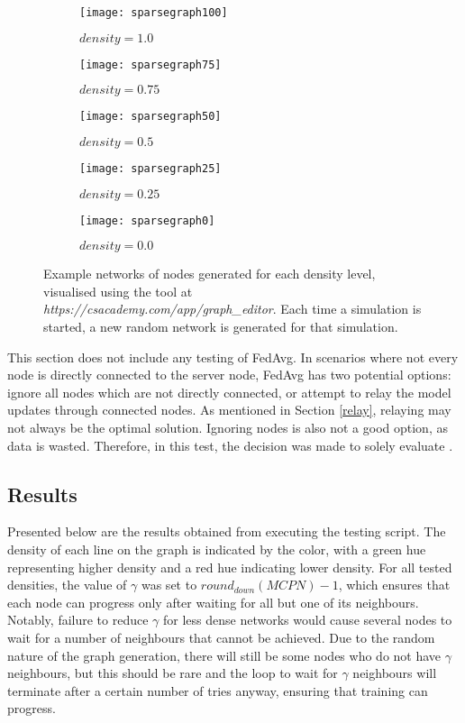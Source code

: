 \begin{figure}[H]
	\centering
	\begin{subfigure}[b]{0.3\textwidth}
		\centering
		\texttt{[image: sparsegraph100]}
		\caption{$density=1.0$}
	\end{subfigure}
	\begin{subfigure}[b]{0.3\textwidth}
		\centering
		\texttt{[image: sparsegraph75]}
		\caption{$density=0.75$}
	\end{subfigure}
	\begin{subfigure}[b]{0.3\textwidth}
		\centering
		\texttt{[image: sparsegraph50]}
		\caption{$density=0.5$}
	\end{subfigure}
	\begin{subfigure}[b]{0.3\textwidth}
		\centering
		\texttt{[image: sparsegraph25]}
		\caption{$density=0.25$}
	\end{subfigure}
	\begin{subfigure}[b]{0.3\textwidth}
		\centering
		\texttt{[image: sparsegraph0]}
		\caption{$density=0.0$}
	\end{subfigure}
	\caption{Example networks of nodes generated for each density level, visualised using the tool at \emph{https://csacademy.com/app/graph\_editor}. Each time a simulation is started, a new random network is generated for that simulation. \label{densefig}}
{}\end{figure}


This section does not include any testing of FedAvg. In scenarios where not every node is directly connected to the server node, FedAvg has two potential options: ignore all nodes which are not directly connected, or attempt to relay the model updates through connected nodes. As mentioned in Section \ref{relay}, relaying may not always be the optimal solution. Ignoring nodes is also not a good option, as data is wasted. Therefore, in this test, the decision was made to solely evaluate \SL.


\subsection{Results}
Presented below are the results obtained from executing the testing script. The density of each line on the graph is indicated by the color, with a green hue representing higher density and a red hue indicating lower density. For all tested densities, the value of $\gamma$ was set to $round_{down}(MCPN) - 1$, which ensures that each node can progress only after waiting for all but one of its neighbours. Notably, failure to reduce $\gamma$ for less dense networks would cause several nodes to wait for a number of neighbours that cannot be achieved. Due to the random nature of the graph generation, there will still be some nodes who do not have $\gamma$ neighbours, but this should be rare and the loop to wait for $\gamma$ neighbours will terminate after a certain number of tries anyway, ensuring that training can progress.

